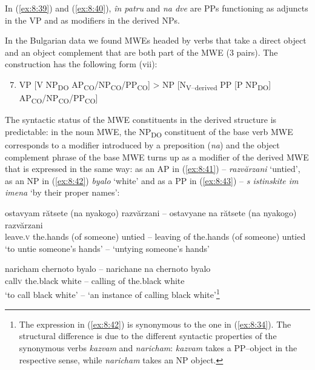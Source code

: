 \documentclass[output=paper]{langsci/langscibook}
\begin{document}
In (\ref{ex:8:39}) and (\ref{ex:8:40}), \textit{în patru} and \textit{na dve} are PPs functioning as
adjuncts in the VP and as modifiers in the derived NPs.



In the Bulgarian data we found MWEs headed by verbs that take a direct
object and an object complement that are both part of the MWE (3
pairs). The construction has the following form (vii):


\renewcommand{\theenumi}{(\roman{enumi})}%
\begin{enumerate}
 \setcounter{enumi}{6}
\item VP [V NP\textsubscript{DO
}AP\textsubscript{CO}/NP\textsubscript{CO}/PP\textsubscript{CO}] > NP
[N\textsubscript{V–derived} PP [P NP\textsubscript{DO}]
AP\textsubscript{CO}/\linebreak NP\textsubscript{CO}/PP\textsubscript{CO}]
\end{enumerate}


The syntactic status of the MWE constituents in the derived structure is
predictable: in the noun MWE, the NP\textsubscript{DO }constituent of
the base verb MWE corresponds to a modifier introduced by a preposition
(\textit{na}) and the object complement phrase of the base MWE turns up as a
modifier of the derived MWE that is expressed in the same way: as an AP
in (\ref{ex:8:41}) – \textit{razvărzani} ‘untied’, as an NP in (\ref{ex:8:42}) \textit{byalo} ‘white’
and as a PP in (\ref{ex:8:43}) – \textit{s istinskite im imena} ‘by their proper
names’:


\begin{exe}
\ex \label{ex:8:41}
\settowidth{}
\gll ostavyam rătsete (na nyakogo) razvărzani – ostavyane na
rătsete (na nyakogo) razvărzani\\
leave.\textsc{v} the.hands (of someone) untied – leaving of the.hands (of someone) untied\\
\glt ‘to untie someone’s hands’ – ‘untying someone's hands’
\end{exe}

\begin{exe}
\ex \label{ex:8:42}
\settowidth{}
\gll naricham chernoto byalo – narichane na chernoto byalo\\
call\textsc{v} {the.black} white – calling of  {the.black} white \\  
\glt ‘to call black white’ – ‘an instance of calling black white’\footnote{ The
expression in (\ref{ex:8:42}) is synonymous to the one in (\ref{ex:8:34}). The structural
difference is due to the different syntactic properties of the
synonymous verbs \textit{kazvam} and \textit{naricham}: \textit{kazvam} takes a PP–object in
the respective sense, while \textit{naricham} takes an NP object.} 
\end{exe}
\end{document}

